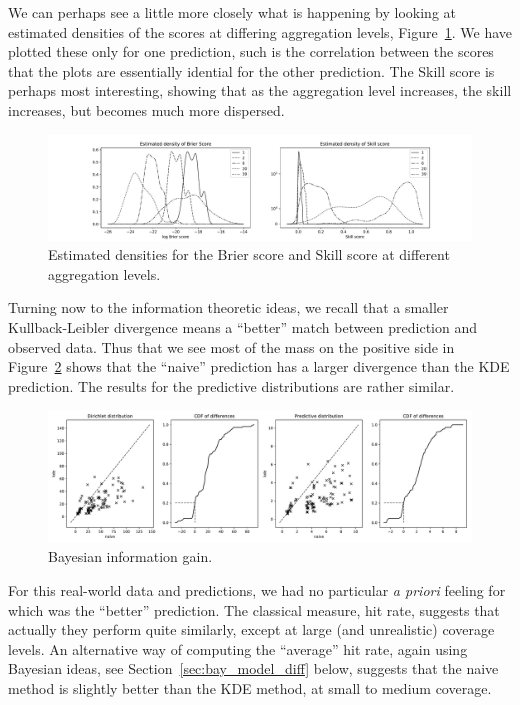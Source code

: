 \documentclass[twoside,a4paper,twocolumn,10pt]{article}
\theoremstyle{plain}
\theoremstyle{definition}
\begin{document}
We can perhaps see a little more closely what is happening by looking at estimated
densities of the scores at differing aggregation levels, Figure~\ref{fig:c1_brier_multi2}.
We have plotted these only
for one prediction, such is the correlation between the scores that the plots are essentially
idential for the other prediction.  The Skill score is perhaps most interesting,
showing that as the aggregation level increases, the skill increases, but becomes much
more dispersed.

\begin{figure}
	\includegraphics[width=\textwidth]{../details/multi_brier_dense.pdf}
  \caption{Estimated densities for the Brier score and Skill score at different
  aggregation levels.}
   \label{fig:c1_brier_multi2}
\end{figure}

Turning now to the information theoretic ideas,
we recall that a smaller Kullback-Leibler divergence means a ``better'' match between
prediction and observed data.  Thus that we see most of the mass on the positive side
in Figure~\ref{fig:c1_bayes} shows that the ``naive'' prediction has a larger divergence
than the KDE prediction.  The results for the predictive distributions are rather similar.

\begin{figure}
	\includegraphics[width=\textwidth]{../details/northside_bayes.pdf}
  \caption{Bayesian information gain.}
   \label{fig:c1_bayes}
\end{figure}

For this real-world data and predictions, we had no particular \emph{a priori} feeling
for which was the ``better'' prediction.  The classical measure, hit rate, suggests
that actually they perform quite similarly, except at large (and unrealistic) coverage
levels.  An alternative way of computing the ``average'' hit rate, again using Bayesian
ideas, see Section~\ref{sec:bay_model_diff} below, suggests that the naive method is
slightly better than the KDE method, at small to medium coverage.
\end{document}
